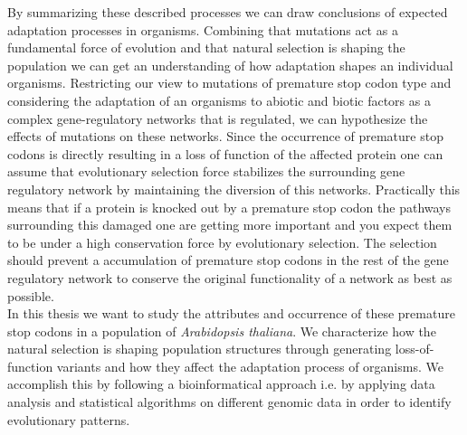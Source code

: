 By summarizing these described processes we can draw conclusions of expected adaptation processes in organisms. Combining that mutations act as a fundamental force of evolution and that natural selection is shaping the population we can get an understanding of how adaptation shapes an individual organisms. Restricting our view to mutations of premature stop codon type and considering the adaptation of an organisms to abiotic and biotic factors as a complex gene-regulatory networks that is regulated, we can hypothesize the effects of mutations on these networks. Since the occurrence of premature stop codons is directly resulting in a loss of function of the affected protein one can assume that evolutionary selection force stabilizes the surrounding gene regulatory network by maintaining the diversion of this networks. Practically this means that if a protein is knocked out by a premature stop codon the pathways surrounding this damaged one are getting more important and you expect them to be under a high conservation force by evolutionary selection. The selection should prevent a accumulation of premature stop codons in the rest of the gene regulatory network to conserve the original functionality of a network as best as possible.\\
In this thesis we want to study the attributes and occurrence of these premature stop codons in a population of \textit{Arabidopsis thaliana}. We characterize how the natural selection is shaping population structures through generating loss-of-function variants and how they affect the adaptation process of organisms. We accomplish this by following a bioinformatical approach i.e. by applying data analysis and statistical algorithms on different genomic data in order to identify evolutionary patterns. 